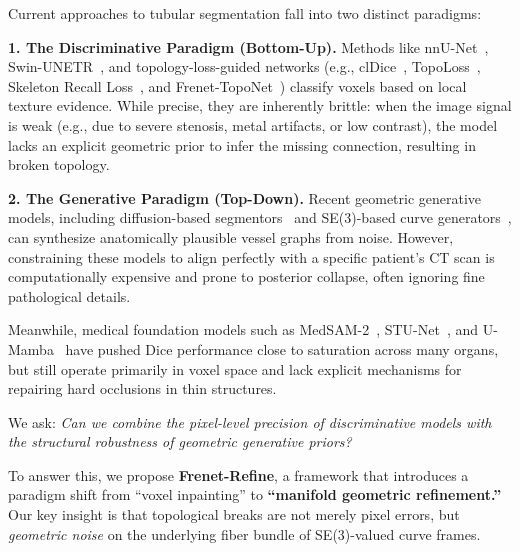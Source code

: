 \documentclass{article}
\newcommand{\modelname}{Frenet-Refine}
\newcommand{\stageone}{Frenet-TopoNet}
\begin{document}
Current approaches to tubular segmentation fall into two distinct paradigms:

\textbf{1. The Discriminative Paradigm (Bottom-Up).}
Methods like nnU-Net~\cite{isensee2021nnunet}, Swin-UNETR~\cite{hatamizadeh2022swinunetr}, and topology-loss-guided networks (e.g., clDice~\cite{shit2021cldice}, TopoLoss~\cite{hu2021topoloss}, Skeleton Recall Loss~\cite{wagner2024skeleton}, and \stageone~\cite{anonymous_ijcai}) classify voxels based on local texture evidence. While precise, they are inherently brittle: when the image signal is weak (e.g., due to severe stenosis, metal artifacts, or low contrast), the model lacks an explicit geometric prior to infer the missing connection, resulting in broken topology.

\textbf{2. The Generative Paradigm (Top-Down).}
Recent geometric generative models, including diffusion-based segmentors~\cite{wu2023medsegdiff,amit2024segdiff,wolleb2022diffusion} and SE(3)-based curve generators~\cite{yim2024se3,anonymous_icml}, can synthesize anatomically plausible vessel graphs from noise. However, constraining these models to align perfectly with a specific patient's CT scan is computationally expensive and prone to posterior collapse, often ignoring fine pathological details.

Meanwhile, medical foundation models such as MedSAM-2~\cite{wu2025medsam2}, STU-Net~\cite{huang2024stu}, and U-Mamba~\cite{ma2024umamba} have pushed Dice performance close to saturation across many organs, but still operate primarily in voxel space and lack explicit mechanisms for repairing hard occlusions in thin structures.

We ask: \emph{Can we combine the pixel-level precision of discriminative models with the structural robustness of geometric generative priors?}

To answer this, we propose \textbf{\modelname}, a framework that introduces a paradigm shift from ``voxel inpainting'' to \textbf{``manifold geometric refinement.''} Our key insight is that topological breaks are not merely pixel errors, but \emph{geometric noise} on the underlying fiber bundle of SE(3)-valued curve frames. 
\end{document}
